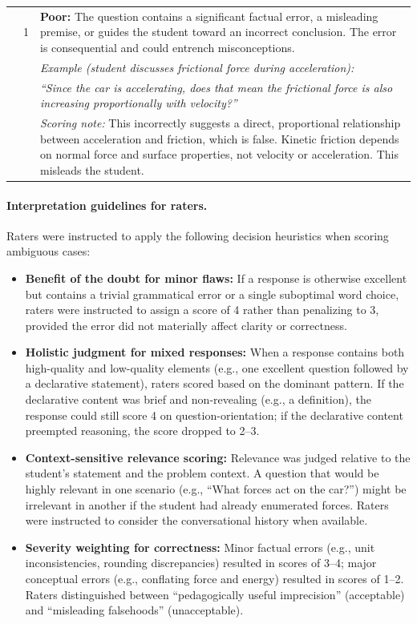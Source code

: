 \begin{longtable}{@{}p{3cm} p{1cm} p{10cm}@{}}
\addlinespace
& 1 & \textbf{Poor:} The question contains a significant factual error, a misleading premise, or guides the student toward an incorrect conclusion. The error is consequential and could entrench misconceptions. \\
& & \textit{Example (student discusses frictional force during acceleration):} \\
& & \textit{``Since the car is accelerating, does that mean the frictional force is also increasing proportionally with velocity?''} \\
& & \textit{Scoring note:} This incorrectly suggests a direct, proportional relationship between acceleration and friction, which is false. Kinetic friction depends on normal force and surface properties, not velocity or acceleration. This misleads the student. \\

\end{longtable}

\paragraph{Interpretation guidelines for raters.} Raters were instructed to apply the following decision heuristics when scoring ambiguous cases:

\begin{itemize}
	\item \textbf{Benefit of the doubt for minor flaws:} If a response is otherwise excellent but contains a trivial grammatical error or a single suboptimal word choice, raters were instructed to assign a score of 4 rather than penalizing to 3, provided the error did not materially affect clarity or correctness.
	\item \textbf{Holistic judgment for mixed responses:} When a response contains both high-quality and low-quality elements (e.g., one excellent question followed by a declarative statement), raters scored based on the dominant pattern. If the declarative content was brief and non-revealing (e.g., a definition), the response could still score 4 on question-orientation; if the declarative content preempted reasoning, the score dropped to 2--3.
	\item \textbf{Context-sensitive relevance scoring:} Relevance was judged relative to the student's statement and the problem context. A question that would be highly relevant in one scenario (e.g., ``What forces act on the car?'') might be irrelevant in another if the student had already enumerated forces. Raters were instructed to consider the conversational history when available.
	\item \textbf{Severity weighting for correctness:} Minor factual errors (e.g., unit inconsistencies, rounding discrepancies) resulted in scores of 3--4; major conceptual errors (e.g., conflating force and energy) resulted in scores of 1--2. Raters distinguished between ``pedagogically useful imprecision'' (acceptable) and ``misleading falsehoods'' (unacceptable).
\end{itemize}

